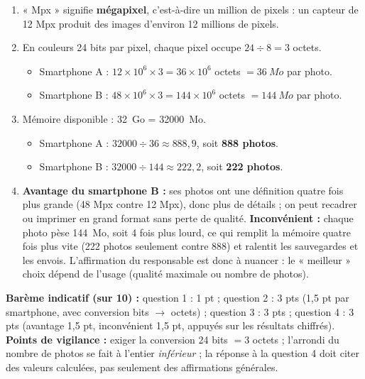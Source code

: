 \documentclass[11pt]{article}
\begin{document}
\begin{corrige}
\begin{enumerate}
\item « Mpx » signifie \textbf{mégapixel}, c'est-à-dire un million de pixels : un capteur de 12 Mpx produit des images d'environ 12 millions de pixels.
\item En couleurs 24 bits par pixel, chaque pixel occupe $24 \div 8 = 3$ octets.
\begin{itemize}
\item Smartphone A : $12 \times 10^6 \times 3 = 36 \times 10^6$ octets $= \SI{36}{Mo}$ par photo.
\item Smartphone B : $48 \times 10^6 \times 3 = 144 \times 10^6$ octets $= \SI{144}{Mo}$ par photo.
\end{itemize}
\item Mémoire disponible : \SI{32}{Go} = \SI{32000}{Mo}.
\begin{itemize}
\item Smartphone A : $\num{32000} \div 36 \approx 888,9$, soit \textbf{888 photos}.
\item Smartphone B : $\num{32000} \div 144 \approx 222,2$, soit \textbf{222 photos}.
\end{itemize}
\item \textbf{Avantage du smartphone B :} ses photos ont une définition quatre fois plus grande (48 Mpx contre 12 Mpx), donc plus de détails ; on peut recadrer ou imprimer en grand format sans perte de qualité. \textbf{Inconvénient :} chaque photo pèse \SI{144}{Mo}, soit 4 fois plus lourd, ce qui remplit la mémoire quatre fois plus vite (222 photos seulement contre 888) et ralentit les sauvegardes et les envois. L'affirmation du responsable est donc à nuancer : le « meilleur » choix dépend de l'usage (qualité maximale ou nombre de photos).
\end{enumerate}
\textbf{Barème indicatif (sur 10) :} question 1 : 1 pt ; question 2 : 3 pts (1,5 pt par smartphone, avec conversion bits $\to$ octets) ; question 3 : 3 pts ; question 4 : 3 pts (avantage 1,5 pt, inconvénient 1,5 pt, appuyés sur les résultats chiffrés).
\textbf{Points de vigilance :} exiger la conversion 24 bits $= 3$ octets ; l'arrondi du nombre de photos se fait à l'entier \emph{inférieur} ; la réponse à la question 4 doit citer des valeurs calculées, pas seulement des affirmations générales.
\end{corrige}
\end{document}

